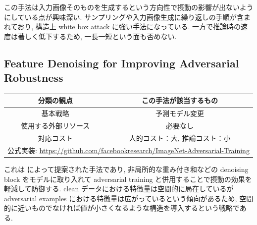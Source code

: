 この手法は入力画像そのものを生成するという方向性で摂動の影響が出ないようにしている点が興味深い.
サンプリングや入力画像生成に繰り返しの手順が含まれており, 構造上 white box attack に強い手法になっている.
一方で推論時の速度は著しく低下するため, 一長一短という面も否めない.



\subsection{Feature Denoising for Improving Adversarial Robustness}
\label{subsec:feature-denoising}
%
\begin{table}[htbp]
\begin{center}
\begin{tabular}{|c|c|}
\hline
分類の観点 & この手法が該当するもの \\
\hline
基本戦略 & 予測モデル変更 \\
使用する外部リソース & 必要なし \\
対応コスト & 人的コスト：大, 推論コスト：小 \\
\hline
\multicolumn{2}{|c|}{公式実装: \href{https://github.com/facebookresearch/ImageNet-Adversarial-Training}{https://github.com/facebookresearch/ImageNet-Adversarial-Training}} \\
\hline
\end{tabular}
\label{tb:feature-denoising-summary}
\end{center}
\end{table}
%

これは \cite{xie2019feature} によって提案された手法であり, 非局所的な重み付き和などの denoising block をモデルに取り入れて adversarial training と併用することで摂動の効果を軽減して防御する.
clean データにおける特徴量は空間的に局在しているが adversarial examples における特徴量は広がっているという傾向があるため, 空間的に近いものでなければ値が小さくなるような構造を導入するという戦略である.


